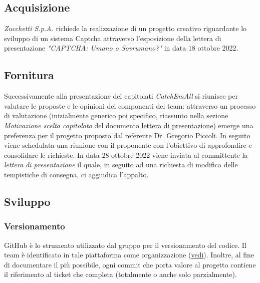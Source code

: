\subsection{Acquisizione}
\textit{Zucchetti S.p.A.} richiede la realizzazione di un progetto creativo riguardante lo sviluppo di un sistema Captcha attraverso l'esposizione della lettera di presentazione \textit{"CAPTCHA: Umano o Sovrumano?"} in data 18 ottobre 2022.

\subsection{Fornitura}
Successivamente alla presentazione dei capitolati \textit{CatchEmAll} si riunisce per valutare le proposte e le opinioni dei componenti del team: attraverso un processo di valutazione (inizialmente generico poi specifico, riassunto nella sezione \textit{Motivazione scelta capitolato} del documento \href{https://github.com/catchEmAll-SWE/catchEmAll-Docs/blob/main/Assegnazione appalti/LetteraCandidatura.pdf}{lettera di presentazione}) emerge una preferenza per il progetto proposto dal referente Dr. Gregorio Piccoli.  
\newline
In seguito viene schedulata una riunione con il proponente con l'obiettivo di approfondire e consolidare le richieste. 
\newline
In data 28 ottobre 2022 viene inviata al committente la \textit{lettera di presentazione} il quale, in seguito ad una richiesta di modifica delle tempistiche di consegna, ci aggiudica l'appalto.

\subsection{Sviluppo}
    \subsubsection{Versionamento}
    GitHub è lo strumento utilizzato dal gruppo per il versionamento del codice.
    Il team è identificato in tale piattaforma come organizzazione (\href{https://github.com/catchEmAll-SWE}{vedi}).
    Inoltre, al fine di documentare il più possibile, ogni commit che porta valore al progetto contiene il riferimento al ticket che completa (totalmente o anche solo parzialmente). 
    
